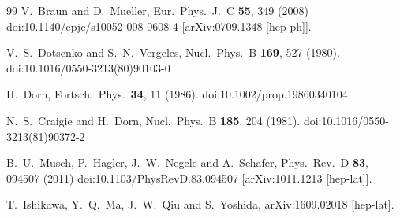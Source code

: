 \begin{thebibliography}{99}
  V.~Braun and D.~Mueller,
  Eur.\ Phys.\ J.\ C {\bf 55}, 349 (2008)
  doi:10.1140/epjc/s10052-008-0608-4
  [arXiv:0709.1348 [hep-ph]].


  V.~S.~Dotsenko and S.~N.~Vergeles,
  Nucl.\ Phys.\ B {\bf 169}, 527 (1980).
  doi:10.1016/0550-3213(80)90103-0

  H.~Dorn,
  Fortsch.\ Phys.\  {\bf 34}, 11 (1986).
  doi:10.1002/prop.19860340104


  N.~S.~Craigie and H.~Dorn,
  Nucl.\ Phys.\ B {\bf 185}, 204 (1981).
  doi:10.1016/0550-3213(81)90372-2


  B.~U.~Musch, P.~Hagler, J.~W.~Negele and A.~Schafer,
  Phys.\ Rev.\ D {\bf 83}, 094507 (2011)
  doi:10.1103/PhysRevD.83.094507
  [arXiv:1011.1213 [hep-lat]].



  T.~Ishikawa, Y.~Q.~Ma, J.~W.~Qiu and S.~Yoshida,
  arXiv:1609.02018 [hep-lat].



\end{thebibliography}
